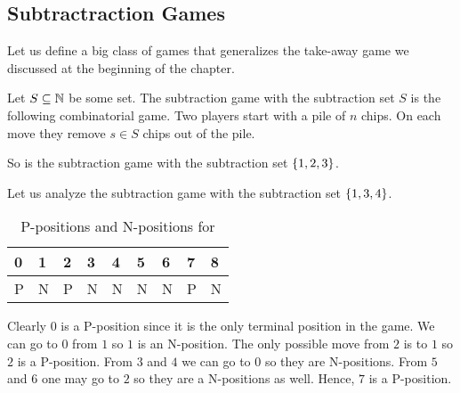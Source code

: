 \subsection{Subtractraction Games}
Let us define a big class of games that generalizes the take-away game we
discussed at the beginning of the chapter.
\begin{game}
  Let $S \subseteq {\mathbb{N}}$ be some set. The subtraction game with the subtraction
  set $S$ is the following combinatorial game.
  Two players start with a pile of $n$ chips.
  On each move they remove $s \in S$ chips out of the pile.
\end{game}

So  is the subtraction game with the subtraction
set $\set{1, 2, 3}$.

Let us analyze the subtraction game with the subtraction set $\set{1, 3, 4}$.
\begin{table}[h!]
  \centering
  \begin{tabular}{l l l l l l l l l}
      \toprule
      0 & 1 & 2 & 3 & 4 & 5 & 6 & 7 & 8 \\
      \midrule
      P & N & P & N & N & N & N & P & N \\
      \bottomrule
  \end{tabular}
  \caption{P-positions and N-positions for }
  \label{table:subtraction-4-3-1}
\end{table}
Clearly $0$ is a P-position since it is the only terminal position in the game.
We can go to $0$ from $1$ so $1$ is an N-position. The only possible move from
$2$ is to $1$ so $2$ is a P-position. From $3$ and $4$ we can go to $0$
so they are N-positions. From $5$ and $6$ one may go to $2$ so they are a
N-positions as well. Hence, $7$ is a P-position.

